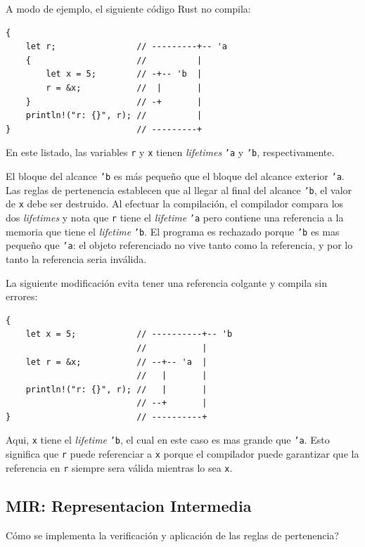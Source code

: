 \documentclass[12pt, a4paper]{article}
\begin{document}
A modo de ejemplo, el siguiente código Rust no compila:

\begin{verbatim}
{
    let r;                // ---------+-- 'a
    {                     //          |
        let x = 5;        // -+-- 'b  |
        r = &x;           //  |       |
    }                     // -+       |
    println!("r: {}", r); //          |
}                         // ---------+
\end{verbatim}

En este listado, las variables \texttt{r} y \texttt{x} tienen \textit{lifetimes} \texttt{'a} y \texttt{'b}, respectivamente.

El bloque del alcance \texttt{'b} es más pequeño que el bloque del alcance exterior \texttt{'a}.
Las reglas de pertenencia establecen que al llegar al final del alcance \texttt{'b}, el valor de \texttt{x} debe ser destruido.
Al efectuar la compilación, el compilador compara los dos \textit{lifetimes} y nota que \texttt{r} tiene el \textit{lifetime} \texttt{'a} pero contiene una referencia a la memoria que tiene el \textit{lifetime} \texttt{'b}.
El programa es rechazado porque \texttt{'b} es mas pequeño que \texttt{'a}: el objeto referenciado no vive tanto como la referencia, y por lo tanto la referencia seria inválida.

La siguiente modificación evita tener una referencia colgante y compila sin errores:

\begin{verbatim}
{
    let x = 5;            // ----------+-- 'b
                          //           |
    let r = &x;           // --+-- 'a  |
                          //   |       |
    println!("r: {}", r); //   |       |
                          // --+       |
}                         // ----------+
\end{verbatim}

Aqui, \texttt{x} tiene el \textit{lifetime} \texttt{'b}, el cual en este caso es mas grande que \texttt{'a}.
Esto significa que \texttt{r} puede referenciar a \texttt{x} porque el compilador puede garantizar que la referencia en \texttt{r} siempre sera válida mientras lo sea \texttt{x}.

\subsection{MIR: Representacion Intermedia}

Cómo se implementa la verificación y aplicación de las reglas de pertenencia?
\end{document}
